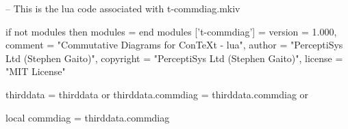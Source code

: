 
\startchapter[title=Preamble]

\startMkIVCode


%
%
\stopMkIVCode

\startMkIVCode
{}

\unprotect

\stopMkIVCode

\startLuaCode
-- This is the lua code associated with t-commdiag.mkiv

if not modules then modules = { } end modules ['t-commdiag'] = {
    version   = 1.000,
    comment   = "Commutative Diagrams for ConTeXt - lua",
    author    = "PerceptiSys Ltd (Stephen Gaito)",
    copyright = "PerceptiSys Ltd (Stephen Gaito)",
    license   = "MIT License"
}

thirddata            = thirddata          or {}
thirddata.commdiag   = thirddata.commdiag or {}

local commdiag       = thirddata.commdiag
\stopLuaCode

\stopchapter